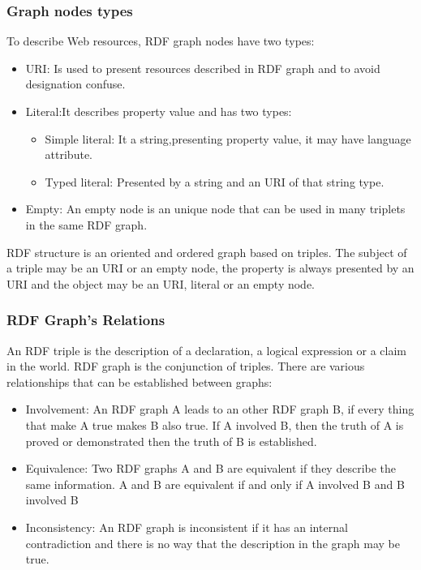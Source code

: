 \subsubsection{Graph nodes types}
To describe Web resources, RDF graph nodes have two types: \begin{itemize}
\item URI: Is used to present resources described in RDF graph and to avoid designation confuse.
\item Literal:It describes property value and has two types: \begin{itemize}
\item Simple literal: It a string,presenting property value, it may have language attribute.
\item Typed literal: Presented by a string and an URI of that string type.
\end{itemize}
\item Empty: An empty node is an unique node that can be used in many triplets in the same RDF graph. 
\end{itemize}
RDF structure is an oriented and ordered graph based on triples. The subject of a triple may be  an URI or an empty node, the property is always presented by an URI and the object may be an URI, literal or an empty node. 

\subsubsection{RDF Graph's Relations}
An RDF triple is the description of a declaration, a logical expression or a claim in the world. RDF graph is the conjunction of triples. There are various relationships that can be established between graphs:\begin{itemize}
\item Involvement: An RDF graph A leads to an other RDF graph B, if every thing that make A true makes B also true. If A involved B, then the truth of A is proved or demonstrated then the truth of B is established.
\item Equivalence: Two RDF graphs A and B are equivalent if they describe the same information. A and B are equivalent if and only if A involved B and B involved B
\item Inconsistency: An RDF graph is inconsistent if it has an internal contradiction and there is no way that the description in the graph may be true.
\end{itemize}



